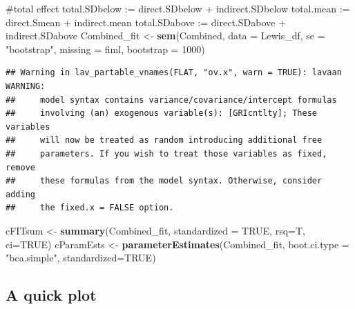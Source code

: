 \documentclass[
  11pt,
]{book}
\newenvironment{Shaded}{\begin{snugshade}}{\end{snugshade}}
\newcommand{\AttributeTok}[1]{\textcolor[rgb]{0.27,0.27,0.27}{#1}}
\newcommand{\ConstantTok}[1]{\textcolor[rgb]{0.37,0.37,0.37}{#1}}
\newcommand{\DecValTok}[1]{\textcolor[rgb]{0.06,0.06,0.06}{#1}}
\newcommand{\FunctionTok}[1]{\textcolor[rgb]{0.27,0.27,0.27}{\textbf{#1}}}
\newcommand{\NormalTok}[1]{#1}
\newcommand{\OtherTok}[1]{\textcolor[rgb]{0.37,0.37,0.37}{#1}}
\newcommand{\StringTok}[1]{\textcolor[rgb]{0.5,0.5,0.5}{#1}}
\begin{document}
\begin{Shaded}
\begin{Highlighting}[]
\StringTok{    \#total effect}
\StringTok{    total.SDbelow := direct.SDbelow + indirect.SDbelow}
\StringTok{    total.mean := direct.Smean + indirect.mean}
\StringTok{    total.SDabove := direct.SDabove + indirect.SDabove}
\StringTok{ \textquotesingle{}}
\NormalTok{Combined\_fit }\OtherTok{\textless{}{-}} \FunctionTok{sem}\NormalTok{(Combined, }\AttributeTok{data =}\NormalTok{ Lewis\_df, }\AttributeTok{se =} \StringTok{"bootstrap"}\NormalTok{, }\AttributeTok{missing =} \StringTok{\textquotesingle{}fiml\textquotesingle{}}\NormalTok{, }\AttributeTok{bootstrap =} \DecValTok{1000}\NormalTok{)}
\end{Highlighting}
\end{Shaded}

\begin{verbatim}
## Warning in lav_partable_vnames(FLAT, "ov.x", warn = TRUE): lavaan WARNING:
##     model syntax contains variance/covariance/intercept formulas
##     involving (an) exogenous variable(s): [GRIcntlty]; These variables
##     will now be treated as random introducing additional free
##     parameters. If you wish to treat those variables as fixed, remove
##     these formulas from the model syntax. Otherwise, consider adding
##     the fixed.x = FALSE option.
\end{verbatim}

\begin{Shaded}
\begin{Highlighting}[]
\NormalTok{cFITsum }\OtherTok{\textless{}{-}} \FunctionTok{summary}\NormalTok{(Combined\_fit, }\AttributeTok{standardized =} \ConstantTok{TRUE}\NormalTok{, }\AttributeTok{rsq=}\NormalTok{T, }\AttributeTok{ci=}\ConstantTok{TRUE}\NormalTok{)    }
\NormalTok{cParamEsts }\OtherTok{\textless{}{-}} \FunctionTok{parameterEstimates}\NormalTok{(Combined\_fit, }\AttributeTok{boot.ci.type =} \StringTok{"bca.simple"}\NormalTok{, }\AttributeTok{standardized=}\ConstantTok{TRUE}\NormalTok{)}
\end{Highlighting}
\end{Shaded}

\hypertarget{a-quick-plot}{%
\subsection{A quick plot}\label{a-quick-plot}}
\end{document}
